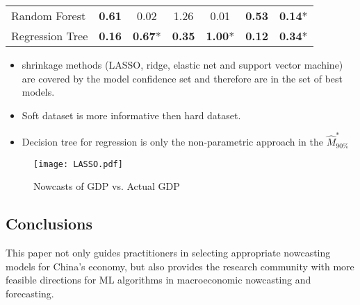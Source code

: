 \documentclass[thesis]{hmcposter}
\begin{document}
\begin{poster}
\begin{table}
\begin{small}
\begin{tabular}{lcc|cc|cc}
  \rowcolor{Gray}
  Random Forest & \textbf{0.61} & 0.02 & 1.26 & 0.01 & \textbf{0.53} & \textbf{0.14}* \\ 
  \rowcolor{Gray}
  Regression Tree & \textbf{0.16} & \textbf{0.67}* & \textbf{0.35} & \textbf{1.00}* & \textbf{0.12} & \textbf{0.34}* \\ 
\bottomrule
\end{tabular}
\end{small}
\end{table}
\begin{itemize}
    \item shrinkage methods (LASSO, ridge, elastic net and support vector machine) are covered by the model confidence set and therefore are in the set of best models.
    \item Soft dataset is more informative then hard dataset.
    \item Decision tree for regression is only the non-parametric approach in the $\hat{M}^*_{90\%}$
\end{itemize}

\vspace{1.2cm}
\begin{figure}
    \centering
    \texttt{[image: LASSO.pdf]}
    \caption{Nowcasts of GDP vs. Actual GDP}
\end{figure}
\subsection{Conclusions}
This paper not only guides practitioners in selecting appropriate nowcasting models for China's economy, but also provides the research community with more feasible directions for ML algorithms in macroeconomic nowcasting and forecasting.
\end{poster}
\end{document}
